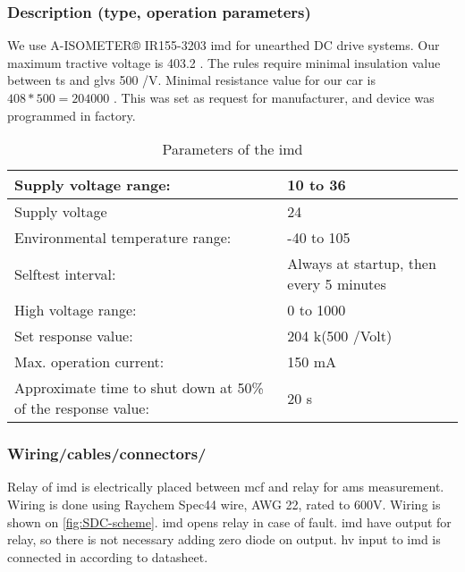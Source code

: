\subsubsection{Description (type, operation parameters)}

We use A-ISOMETER® IR155-3203 \Acrfull{imd} for unearthed DC drive systems. Our maximum tractive voltage is 403.2 \vdc. The rules require minimal insulation value between \gls{ts} and \gls{glvs} 500 \ohm/V. Minimal resistance value for our car is $408*500 = 204 000$ \ohm. This was set as request for manufacturer, and device was programmed in factory.
\begin{table}[H]
	\centering
	\caption{Parameters of the \gls{imd}}
	\begin{tabu}{|X|l|}
	 \hline	Supply voltage range: & 10 to 36 \vdc \\
	 \hline	Supply voltage & 24 \vdc \\
	 \hline	Environmental temperature range: & -40 to 105 \degC \\
	 \hline	Selftest interval: & Always at startup, then every 5 minutes \\
	 \hline	High voltage range: & 0 to 1000 \vdc \\
	 \hline	Set response value: & 204 k\ohm (500 \ohm/Volt) \\
	 \hline	Max. operation current: & 150 mA \\
	 \hline	Approximate time to shut down at 50\% of the response value: & 20 s \\
	  \hline
	\end{tabu}%
	\label{tab:IMD}%
\end{table}%

\subsubsection{Wiring/cables/connectors/}

Relay of \gls{imd} is electrically placed between \gls{mcf} and relay for \gls{ams} measurement. Wiring is done using Raychem Spec44 wire, AWG 22, rated to 600V. Wiring is shown on \ref{fig:SDC-scheme}. \gls{imd} opens relay in case of fault. \gls{imd} have output for relay, so there is not necessary adding zero diode on output. \gls{hv} input to \gls{imd} is connected in according to datasheet.

